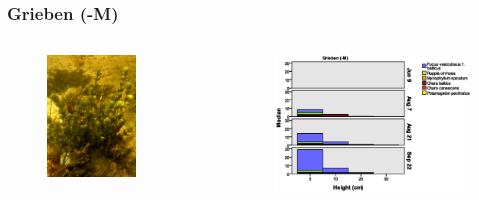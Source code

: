 \documentclass{beamer}
\begin{document}
\begin{frame}
\frametitle{Grieben (-M)}
\begin{columns}
\begin{column}{4.8cm}
\begin{figure}
\includegraphics[width=0.7\textwidth]{images/Fotos/DSCF0876.JPG}
\end{figure}
\end{column}
\begin{column}{8.0cm}
\begin{figure}
\includegraphics[width=\textwidth]{images/Wuchshoehenkartierung/Grieben-M1.eps}
\end{figure}
\end{column}
\end{columns}
\end{frame}
\end{document}

